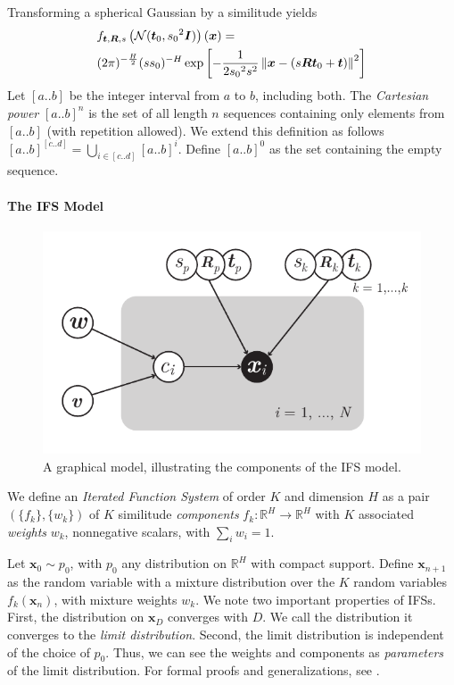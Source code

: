 \documentclass[reprint,amsmath,amssymb,aps,prl]{revtex4-1}
\newcommand{\R}{\mathbb{R}}
\newcommand{\cN}{{\cal N}}
\newcommand{\bx}{\boldsymbol x}
\newcommand{\bt}{\boldsymbol t}
\newcommand{\bI}{\boldsymbol I}
\newcommand{\bR}{\boldsymbol R}
\begin{document}
Transforming a spherical Gaussian by a similitude yields
\begin{align}
&f_{\bt, \bR, s}\left(\cN(\bt_0, {s_0}^2 \bI)\right)(\bx) = \notag \\
&(2\pi)^{-\frac{H}{2}} ({ss_0})^{-H} \exp \left[- \frac{1}{2{s_0}^2s^2}\left\| \bx - (s \bR \bt_0 + \bt)\right \|^2\right] \label{line:inverse}
\end{align}
Let $[a .. b]$ be the integer interval from $a$ to $b$, including both. The \emph{Cartesian power} $[a .. b]^n$ is the set of all length $n$ sequences containing only elements from $[a .. b]$ (with repetition allowed). We extend this definition as follows $[a .. b]^{[c .. d]} = \bigcup_{i \in [c .. d]} [a .. b]^i$. Define $[a .. b]^0$ as the set containing the empty sequence. 

\paragraph{The IFS Model} 

\begin{figure}[bt]
  \center
  \includegraphics[width=\linewidth]{../img/factor-graph.pdf}
  \caption{A graphical model, illustrating the components of the IFS model.}
  \label{figure:ifs-diagram}
\end{figure}

We define an \emph{Iterated Function System} of order $K$ and dimension $H$ as a pair $(\{f_k\}, \{w_k\})$ of $K$ similitude \emph{components} $f_k: \R^H \to \R^H$ with $K$ associated \emph{weights} $w_k$, nonnegative scalars, with $\sum_i w_i = 1$.  

Let $\bx_0 \sim p_0$, with $p_0$ any distribution on $\R^H$ with compact support. Define $\bx_{n+1}$ as the random variable with a mixture distribution over the $K$ random variables $f_k(\bx_n)$, with mixture weights $w_k$. We note two important properties of IFSs. First, the distribution on $\bx_D$ converges with $D$. We call the distribution it converges to the \emph{limit distribution}. Second, the limit distribution is independent of the choice of $p_0$. Thus, we can see the weights and components as \emph{parameters} of the limit distribution. For formal proofs and generalizations, see \cite{hutchinson2000deterministic}.
\end{document}
